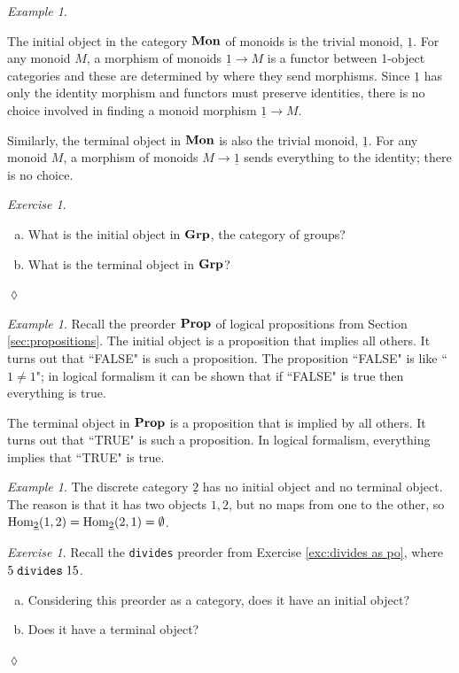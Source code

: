 \documentclass{book}
\def\tn{\textnormal}
\def\Hom{\tn{Hom}}
\def\to{\rightarrow}
\def\ul{\underline}
\def\Mon{{\bf Mon}}
\def\Grp{{\bf Grp}}
\def\Prop{{\bf Prop}}
\theoremstyle{remark}
\newtheorem{example}[subsubsection]{Example}
\newtheorem{exc}[subsubsection]{Exercise}
\newenvironment{exercise}{\begin{exc}}{\hspace*{\fill}$\lozenge$\end{exc}}
\theoremstyle{definition}
\def\sexc{\begin{enumerate}[a.)]\setlength{\itemsep}{.1cm}\setlength{\parskip}{.1cm}\item}
\def\next{\item}
\def\endsexc{\end{enumerate}}
\begin{document}
\begin{example}\label{ex:initial monoid terminal monoid}

The initial object in the category $\Mon$ of monoids is the trivial monoid, $\ul{1}$. For any monoid $M$, a morphism of monoids $\ul{1}\to M$ is a functor between 1-object categories and these are determined by where they send morphisms. Since $\ul{1}$ has only the identity morphism and functors must preserve identities, there is no choice involved in finding a monoid morphism $\ul{1}\to M$.

Similarly, the terminal object in $\Mon$ is also the trivial monoid, $\ul{1}$. For any monoid $M$, a morphism of monoids $M\to\ul{1}$ sends everything to the identity; there is no choice.

\end{example}

\begin{exercise}~
\sexc What is the initial object in $\Grp$, the category of groups?
\next What is the terminal object in $\Grp$?
\endsexc
\end{exercise}
\begin{example}

Recall the preorder $\Prop$ of logical propositions from Section \ref{sec:propositions}. The initial object is a proposition that implies all others. It turns out that ``FALSE" is such a proposition. The proposition ``FALSE" is like ``$1\neq1$"; in logical formalism it can be shown that if ``FALSE" is true then everything is true.

The terminal object in $\Prop$ is a proposition that is implied by all others. It turns out that ``TRUE" is such a proposition. In logical formalism, everything implies that ``TRUE" is true.

\end{example}

\begin{example}

The discrete category $\ul{2}$ has no initial object and no terminal object. The reason is that it has two objects $1,2$, but no maps from one to the other, so $\Hom_{\ul{2}}(1,2)=\Hom_{\ul{2}}(2,1)=\emptyset$.

\end{example}

\begin{exercise}
Recall the {\tt divides} preorder from Exercise \ref{exc:divides as po}, where $5\;{\tt divides}\;15$.
\sexc Considering this preorder as a category, does it have an initial object?
\next Does it have a terminal object?
\endsexc
\end{exercise}
\end{document}
